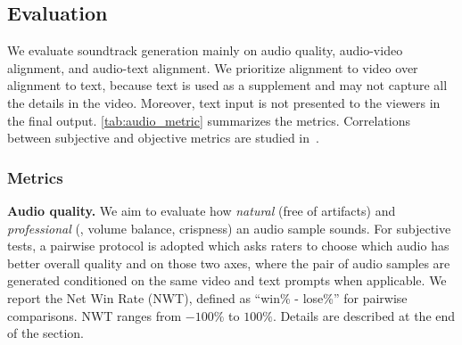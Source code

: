 \subsection{Evaluation}

We evaluate soundtrack generation mainly on audio quality, audio-video alignment, and audio-text alignment.
We prioritize alignment to video over alignment to text, because text is used as a supplement and may not capture all the details in the video.
Moreover, text input is not presented to the viewers in the final output.
\cref{tab:audio_metric} summarizes the metrics. Correlations between subjective and objective metrics are studied in~.


\begin{table}[h]
    \centering
    \caption{\textbf{\OursAudio evaluation metrics}. Audio quality measures the standalone quality of the generated audio, while video and text alignment measure how well the generated audio aligns with the input video and text respectively.}
    \label{tab:audio_metric}
\end{table}

\subsubsection{Metrics\label{sec:audiobox_metrics}}
\noindent\textbf{Audio quality.}
We aim to evaluate how \textit{natural} (free of artifacts) and \textit{professional} (\eg, volume balance, crispness) an audio sample sounds.
For subjective tests, a pairwise protocol is adopted which asks raters to choose which audio has better overall quality and on those two axes,
where the pair of audio samples are generated conditioned on the same video and text prompts when applicable.
We report the Net Win Rate (NWT), defined as ``win\% - lose\%'' for pairwise comparisons.
NWT ranges from $-100\%$  to $100\%$. Details are described at the end of the section.

